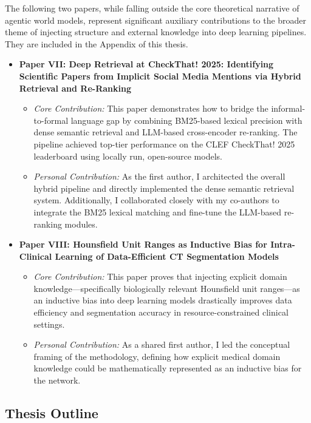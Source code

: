 The following two papers, while falling outside the core theoretical narrative of agentic world models, represent significant auxiliary contributions to the broader theme of injecting structure and external knowledge into deep learning pipelines. They are included in the Appendix of this thesis.

\begin{itemize}
    \item \textbf{Paper VII: Deep Retrieval at CheckThat! 2025: Identifying Scientific Papers from Implicit Social Media Mentions via Hybrid Retrieval and Re-Ranking}
    \begin{itemize}
        \item \textit{Core Contribution:} This paper demonstrates how to bridge the informal-to-formal language gap by combining BM25-based lexical precision with dense semantic retrieval and LLM-based cross-encoder re-ranking. The pipeline achieved top-tier performance on the CLEF CheckThat! 2025 leaderboard using locally run, open-source models.
        \item \textit{Personal Contribution:} As the first author, I architected the overall hybrid pipeline and directly implemented the dense semantic retrieval system. Additionally, I collaborated closely with my co-authors to integrate the BM25 lexical matching and fine-tune the LLM-based re-ranking modules.
    \end{itemize}

    \item \textbf{Paper VIII: Hounsfield Unit Ranges as Inductive Bias for Intra-Clinical Learning of Data-Efficient CT Segmentation Models}
    \begin{itemize}
        \item \textit{Core Contribution:} This paper proves that injecting explicit domain knowledge---specifically biologically relevant Hounsfield unit ranges---as an inductive bias into deep learning models drastically improves data efficiency and segmentation accuracy in resource-constrained clinical settings.
        \item \textit{Personal Contribution:} As a shared first author, I led the conceptual framing of the methodology, defining how explicit medical domain knowledge could be mathematically represented as an inductive bias for the network.
    \end{itemize}
\end{itemize}


\subsection{Thesis Outline}

